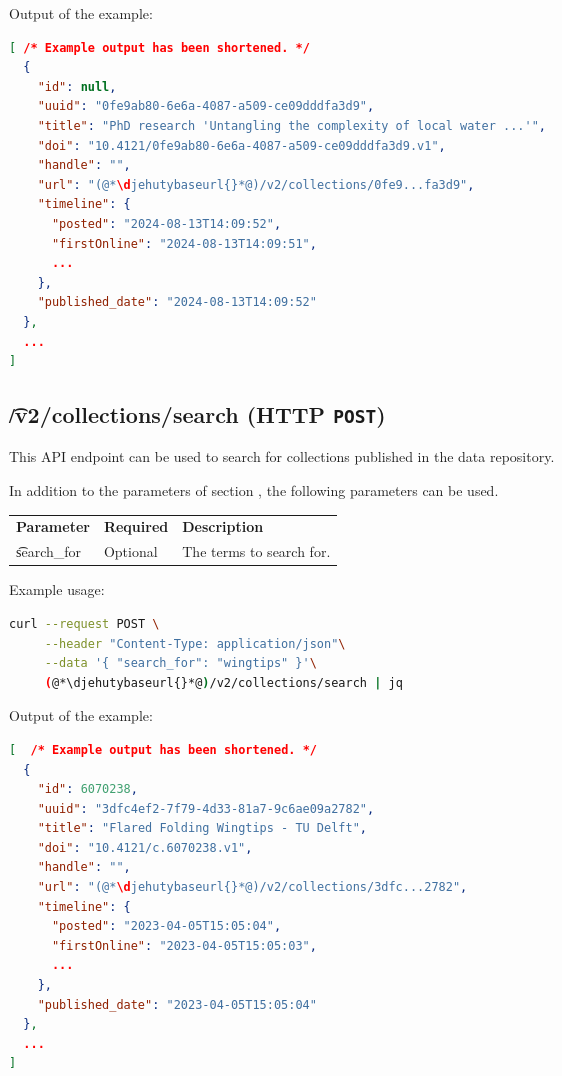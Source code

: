 Output of the example:
\begin{lstlisting}[language=JSON]
[ /* Example output has been shortened. */
  {
    "id": null,
    "uuid": "0fe9ab80-6e6a-4087-a509-ce09dddfa3d9",
    "title": "PhD research 'Untangling the complexity of local water ...'",
    "doi": "10.4121/0fe9ab80-6e6a-4087-a509-ce09dddfa3d9.v1",
    "handle": "",
    "url": "(@*\djehutybaseurl{}*@)/v2/collections/0fe9...fa3d9",
    "timeline": {
      "posted": "2024-08-13T14:09:52",
      "firstOnline": "2024-08-13T14:09:51",
      ...
    },
    "published_date": "2024-08-13T14:09:52"
  },
  ...
]
\end{lstlisting}

\subsection{\t{/v2/collections/search} (HTTP \texttt{POST})}

  This API endpoint can be used to search for collections published in
  the data repository.

  In addition to the parameters of section , the
  following parameters can be used.

\begin{tabularx}{\textwidth}{*{2}{!{\VRule[-1pt]}l}!{\VRule[-1pt]}X}
  \headrow
  \textbf{Parameter}   & \textbf{Required} & \textbf{Description}\\
  \t{search\_for}      & Optional          & The terms to search for.\\
\end{tabularx}

  Example usage:
\begin{lstlisting}[language=bash]
curl --request POST \
     --header "Content-Type: application/json"\
     --data '{ "search_for": "wingtips" }'\
     (@*\djehutybaseurl{}*@)/v2/collections/search | jq
\end{lstlisting}

  Output of the example:
\begin{lstlisting}[language=JSON]
[  /* Example output has been shortened. */
  {
    "id": 6070238,
    "uuid": "3dfc4ef2-7f79-4d33-81a7-9c6ae09a2782",
    "title": "Flared Folding Wingtips - TU Delft",
    "doi": "10.4121/c.6070238.v1",
    "handle": "",
    "url": "(@*\djehutybaseurl{}*@)/v2/collections/3dfc...2782",
    "timeline": {
      "posted": "2023-04-05T15:05:04",
      "firstOnline": "2023-04-05T15:05:03",
      ...
    },
    "published_date": "2023-04-05T15:05:04"
  },
  ...
]
\end{lstlisting}

